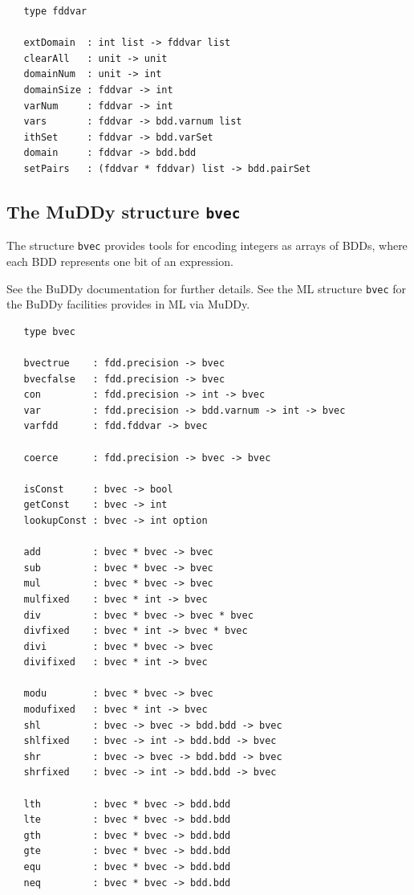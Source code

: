 \documentclass[12pt,fleqn]{article}
\renewcommand{\t}[1]{\mbox{\tt #1}}
\newcommand{\Buddy}{BuDDy{}}
\newcommand{\Muddy}{MuDDy{}}
\begin{document}
\begin{verbatim}
   type fddvar

   extDomain  : int list -> fddvar list
   clearAll   : unit -> unit
   domainNum  : unit -> int
   domainSize : fddvar -> int
   varNum     : fddvar -> int
   vars       : fddvar -> bdd.varnum list
   ithSet     : fddvar -> bdd.varSet
   domain     : fddvar -> bdd.bdd
   setPairs   : (fddvar * fddvar) list -> bdd.pairSet
\end{verbatim}

\subsection{The \Muddy{} structure \t{bvec}}\label{bvec}

The structure \t{bvec} provides tools for encoding integers as arrays
of BDDs, where each BDD represents one bit of an expression.

See the \Buddy{} documentation \cite{BuDDy} for further details. See the ML structure \t{bvec}
for the \Buddy{} facilities provides in ML via \Muddy{}.


\begin{verbatim}
   type bvec

   bvectrue    : fdd.precision -> bvec
   bvecfalse   : fdd.precision -> bvec
   con         : fdd.precision -> int -> bvec
   var         : fdd.precision -> bdd.varnum -> int -> bvec
   varfdd      : fdd.fddvar -> bvec

   coerce      : fdd.precision -> bvec -> bvec

   isConst     : bvec -> bool
   getConst    : bvec -> int
   lookupConst : bvec -> int option

   add         : bvec * bvec -> bvec
   sub         : bvec * bvec -> bvec
   mul         : bvec * bvec -> bvec
   mulfixed    : bvec * int -> bvec
   div         : bvec * bvec -> bvec * bvec
   divfixed    : bvec * int -> bvec * bvec
   divi        : bvec * bvec -> bvec
   divifixed   : bvec * int -> bvec

   modu        : bvec * bvec -> bvec
   modufixed   : bvec * int -> bvec
   shl         : bvec -> bvec -> bdd.bdd -> bvec
   shlfixed    : bvec -> int -> bdd.bdd -> bvec
   shr         : bvec -> bvec -> bdd.bdd -> bvec
   shrfixed    : bvec -> int -> bdd.bdd -> bvec

   lth         : bvec * bvec -> bdd.bdd
   lte         : bvec * bvec -> bdd.bdd
   gth         : bvec * bvec -> bdd.bdd
   gte         : bvec * bvec -> bdd.bdd
   equ         : bvec * bvec -> bdd.bdd
   neq         : bvec * bvec -> bdd.bdd
\end{verbatim}
\end{document}
